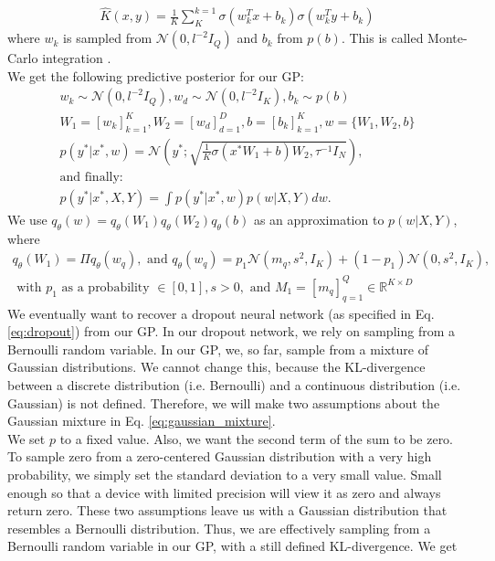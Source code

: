 \documentclass[a4paper,cleardoubleempty,BCOR1cm, 11pt]{report}
\begin{document}
\begin{align*}
	\hat{K}(x,y) = \frac{1}{K} \sum_{K}^{k=1} \sigma(w^T_k x + b_k)\sigma(w^T_k y + b_k)
\end{align*}
where $w_k$ is sampled from $\mathcal{N}(0, l^{-2}I_Q)$ and $b_k$ from $p(b)$. This is called Monte-Carlo integration \cite{metropolis1949monte}.\\
We get the following predictive posterior for our GP:
\begin{align*}
w_k \sim \mathcal{N}(0, l^{-2}I_Q), w_d \sim \mathcal{N}(0, l^{-2} I_K), b_k \sim p(b)\\
W_1 = \left[ w_k \right]^{K}_{k=1}, W_2 = \left[ w_d \right]^D_{d=1}, b = \left[ b_k \right]^K_{k=1}, w = \lbrace W_1, W_2, b \rbrace\\
p(y^*|x^*, w) = \mathcal{N} \left( y^*; \sqrt{\frac{1}{K}\sigma(x^* W_1 + b)W_2, \tau^{-1}I_N}\right),\\
\text{and finally:}\hspace{160pt}\\
p(y^*|x^*, X,Y) = \int p(y^*|x^*, w)p(w|X,Y)dw.
\end{align*}
We use $q_{\theta}(w) = q_{\theta}(W_1)q_{\theta}(W_2)q_{\theta}(b)$ as an approximation to $p(w|X,Y)$, where
\begin{align}\label{eq:gaussian_mixture}
q_{\theta}(W_1) = \Pi q_{\theta}(w_q), \text{ and } q_{\theta}(w_q) = p_1\mathcal{N}(m_q, s^2, I_K) + (1-p_1) \mathcal{N}(0, s^2, I_K),\\
\text{ with } p_1 \text{ as a probability }\in \left[ 0, 1\right], s > 0, \text{ and }M_1 = \left[ m_q \right]^Q_{q=1} \in \mathbb{R}^{K\times D}
\end{align}
We eventually want to recover a dropout neural network (as specified in Eq. \ref{eq:dropout}) from our GP. In our dropout network, we rely on sampling from a Bernoulli random variable. In our GP, we, so far, sample from a mixture of Gaussian distributions. We cannot change this, because the KL-divergence between a discrete distribution (i.e. Bernoulli) and a continuous distribution (i.e. Gaussian) is not defined. Therefore, we will make two assumptions about the Gaussian mixture in Eq. \ref{eq:gaussian_mixture}.\\
We set $p$ to a fixed value. Also, we want the second term of the sum to be zero. To sample zero from a zero-centered Gaussian distribution with a very high probability, we simply set the standard deviation to a very small value. Small enough so that a device with limited precision will view it as zero and always return zero. These two assumptions leave us with a Gaussian distribution that resembles a Bernoulli distribution. Thus, we are effectively sampling from a Bernoulli random variable in our GP, with a still defined KL-divergence. We get
\end{document}
